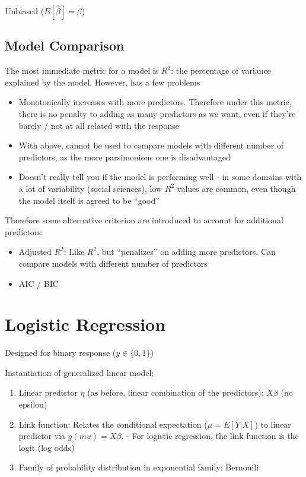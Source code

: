\documentclass{article}
\begin{document}
Unbiased ($E[\hat{\beta}] = \beta$)

\subsection{Model Comparison}

The most immediate metric for a model is $R^2$: the percentage of variance explained by the model. However, has a few problems

\begin{itemize}
	\item Monotonically increases with more predictors. Therefore under this metric, there is no penalty to adding as many predictors as we want, even if they're barely / not at all related with the response
	\item With above, cannot be used to compare models with different number of predictors, as the more parsimonious one is disadvantaged
	\item Doesn't really tell you if the model is performing well - in some domains with a lot of variability (social sciences), low $R^2$ values are common, even though the model itself is agreed to be ``good''
\end{itemize}
	
Therefore some alternative criterion are introduced to account for additional predictors:

\begin{itemize}
	\item Adjusted $R^2$: Like $R^2$, but ``penalizes'' on adding more predictors. Can compare models with different number of predictors
	\item AIC / BIC
\end{itemize}

\section{Logistic Regression}


Designed for binary response ($y \in  \{0, 1\}$)

Instantiation of generalized linear model:
\begin{enumerate}
	\item Linear predictor $\eta$ (as before, linear combination of the predictors): $X\beta$ (no epsilon)
	\item Link function: Relates the conditional expectation ($\mu = E[Y|X]$) to linear predictor via $g(mu) = X\beta$.
		- For logistic regression, the link function is the logit (log odds)
	\item Family of probability distribution in exponential family: Bernouili
\end{enumerate}
\end{document}
